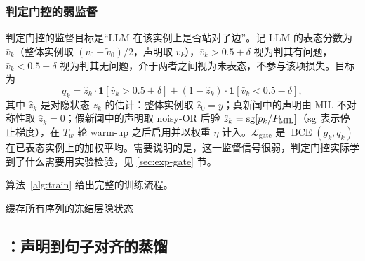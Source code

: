 \subsubsection{判定门控的弱监督}
判定门控的监督目标是“LLM 在该实例上是否站对了边”。记 LLM 的表态分数为 $\bar v_k$（整体实例取 $(v_0+\tilde v_0)/2$，声明取 $v_k$），$\bar v_k>0.5+\delta$ 视为判其有问题，$\bar v_k<0.5-\delta$ 视为判其无问题，介于两者之间视为未表态，不参与该项损失。目标为
\begin{equation}
q_k=\hat z_k\cdot\mathbf{1}[\bar v_k>0.5+\delta]+(1-\hat z_k)\cdot\mathbf{1}[\bar v_k<0.5-\delta],
\end{equation}
其中 $\hat z_k$ 是对隐状态 $z_k$ 的估计：整体实例取 $\hat z_0=y$；真新闻中的声明由 MIL 不对称性取 $\hat z_k=0$；假新闻中的声明取 noisy-OR 后验 $\hat z_k=\operatorname{sg}[p_k/P_{\mathrm{MIL}}]$（$\operatorname{sg}$ 表示停止梯度），在 $T_w$ 轮 warm-up 之后启用并以权重 $\eta$ 计入。$\mathcal L_{\mathrm{gate}}$ 是 $\operatorname{BCE}(g_k,q_k)$ 在已表态实例上的加权平均。需要说明的是，这一监督信号很弱，判定门控实际学到了什么需要用实验检验，见 \ref{sec:exp-gate} 节。

算法~\ref{alg:train} 给出完整的训练流程。

\begin{algorithm}[t]
\caption{\method{} 的训练}\label{alg:train}
缓存所有序列的冻结层隐状态\;
\end{algorithm}

\subsection{\student{}：声明到句子对齐的蒸馏}\label{sec:student}

